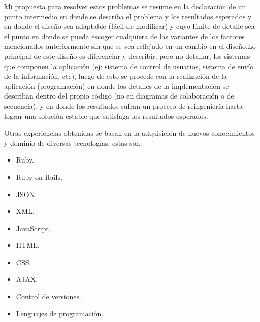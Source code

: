 Mi propuesta para resolver estos problemas se resume en la declaración de un punto intermedio en donde se describa el problema y los resultados esperados y en donde el diseño sea adaptable (fácil de modificar) y cuyo límite de detalle sea el punto en donde se pueda escoger cualquiera de las variantes de los factores mencionados anteriormente sin que se vea reflejado en un cambio en el diseño.\newline Lo principal de este diseño es diferenciar y describir, pero no detallar, los sistemas que componen la aplicación (ej: sistema de control de usuarios, sistema de envío de la información, etc), luego de esto se procede con la realización de la aplicación (programación) en donde los detalles de la implementación se describan dentro del propio código (no en diagramas de colaboración o de secuencia), y en donde los resultados sufran un proceso de reingeniería hasta lograr una solución estable que satisfaga los resultados esperados.

Otras experiencias obtenidas se basan en la adquisición de nuevos conocimientos y dominio de diversas tecnologías, estas son:

\begin{itemize}
	\item Ruby.
	\item Ruby on Rails.
	\item JSON.
	\item XML.
	\item JavaScript.
	\item HTML.
	\item CSS.
	\item AJAX.
	\item Control de versiones.
	\item Lenguajes de programación.
\end{itemize}

